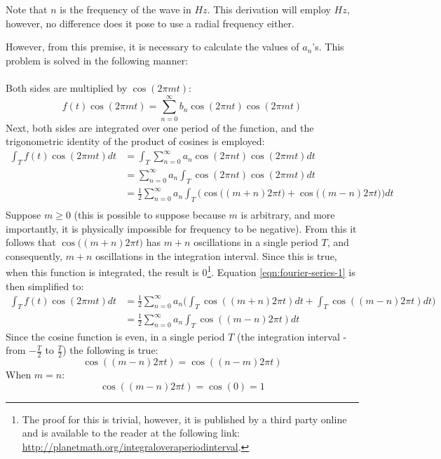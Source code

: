 \documentclass{article}
\begin{document}
Note that $n$ is the frequency of the wave in $\si{Hz}$. This derivation will 
employ $\si{Hz}$, however, no difference does it pose to use a radial frequency
either.

However, from this premise, it is necessary to calculate the values of $a_n$'s. 
This problem is solved in the following manner:

\paragraph*{}
Both sides are multiplied by $\cos(2 \pi m t)$:
$$f(t) \cos(2 \pi m t) = \sum^{\infty}_{n=0}b_n \cos(2 \pi n t) \cos(2 \pi m t)$$
Next, both sides are integrated over one period of the function, and the 
trigonometric identity of the product of cosines is employed:
\begin{equation}
	\begin{aligned}
		\int_{T} f(t) \cos(2 \pi m t) dt &= 
		\int_{T} \sum^{\infty}_{n=0} a_n \cos(2 \pi n t) \cos(2 \pi m t) dt \\
		&= \sum^{\infty}_{n=0} a_n \int_{T} \cos(2 \pi n t) \cos(2 \pi m t) dt \\
		&= \frac{1}{2} \sum^{\infty}_{n=0} a_n \int_{T} \Big(\cos \big( (m + n) 2 \pi t \big) + \cos \big( (m - n) 2 \pi t \big) \Big) dt \\
	\end{aligned}
	\label{eqn:fourier-series-1}
\end{equation}
Suppose $m \geq 0$ (this is possible to suppose because $m$ is arbitrary, and 
more importantly, it is physically impossible for frequency to be negative). 
From this it follows that $\cos \big( (m + n) 2 \pi t \big)$ has $m + n$ 
oscillations in a single period $T$, and consequently, $m + n$ oscillations in 
the integration interval. Since this is true, when this function is integrated, 
the result is $0$\footnote{The proof for this is trivial, however, it is 
published by a third party online and is available to the reader at the 
following link: \url{http://planetmath.org/integraloveraperiodinterval}.}. 
Equation \ref{eqn:fourier-series-1} is then simplified to:
\begin{equation}
	\begin{aligned}
		\int_{T} f(t) \cos(2 \pi m t) dt &=
		\frac{1}{2} \sum^{\infty}_{n=0} a_n \bigg(\int_{T} \cos( (m + n) 2 \pi t) dt + 
		\int_{T} \cos( (m - n) 2 \pi t) dt \bigg) \\
		&= \frac{1}{2} \sum^{\infty}_{n=0} a_n \int_{T} \cos( (m - n) 2 \pi t) dt
	\end{aligned}
	\label{eqn:fourier-series-2}
\end{equation}
Since the cosine function is even, in a single period $T$ (the integration 
interval - from $-\frac{T}{2}$ to $\frac{T}{2}$) the following is true:
$$\cos( (m - n) 2 \pi t) = \cos( (n - m) 2 \pi t)$$
When $m = n$:
$$\cos( (m - n) 2 \pi t) = \cos(0) = 1$$
\end{document}
